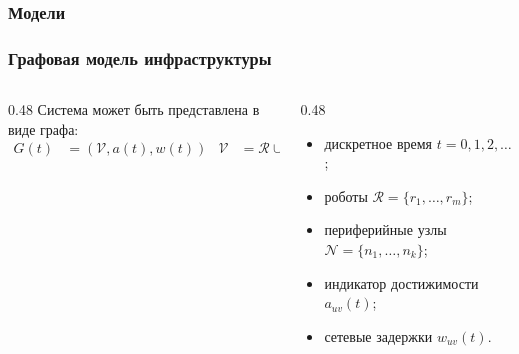 \begin{frame}
	\frametitle{Модели}
	\small
	\begin{center}
	\end{center}
\end{frame}


\begin{frame}
	\frametitle{Графовая модель инфраструктуры}
	\footnotesize
	\begin{columns}[T,onlytextwidth]
		\begin{column}{0.48\textwidth}
			Система может быть представлена в виде графа:
			\begin{align*}
				G(t)&=(\mathcal{V},a(t),w(t)) & \mathcal{V}&=\mathcal{R}\cup\mathcal{N},
			\end{align*}
			\begin{center}
			\end{center}
		\end{column}
		\begin{column}{0.48\textwidth}
			\small
			\begin{itemize}
				\item дискретное время $t=0,1,2,\ldots$;
				\item роботы $\mathcal{R}=\{r_1,\ldots,r_m\}$;
				\item периферийные узлы $\mathcal{N}=\{n_1,\ldots,n_k\}$;
				\item индикатор достижимости $a_{uv}(t)$;
				\item сетевые задержки $w_{uv}(t)$.
			\end{itemize}
		\end{column}
	\end{columns}
\end{frame}

